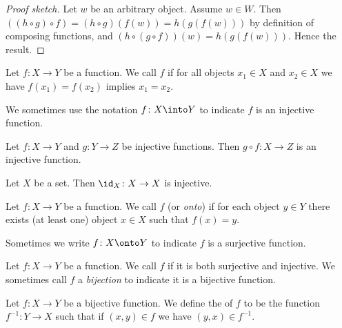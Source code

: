 \begin{proof}[Proof sketch]
Let $w$ be an arbitrary object. Assume $w\in W$. Then
$((h\circ g)\circ f) = (h\circ g)(f(w)) = h(g(f(w)))$ by definition of composing
functions, and $(h\circ(g\circ f))(w)=h(g(f(w)))$. Hence the result.
\end{proof}

\begin{definition}
Let $f\colon X\to Y$ be a function. We call $f$  if
for all objects $x_{1}\in X$ and $x_{2}\in X$ we have
$f(x_{1})=f(x_{2})$ implies $x_{1}=x_{2}$.

We sometimes use the notation $f\colon X\into Y$ to indicate $f$ is an
injective function.
\end{definition}

\begin{theorem}
Let $f\colon X\to Y$ and $g\colon Y\to Z$ be injective functions.
Then $g\circ f\colon X\to Z$ is an injective function.
\end{theorem}

\begin{theorem}
Let $X$ be a set. Then $\id_{X}\colon X\to X$ is injective.
\end{theorem}

\begin{definition}
Let $f\colon X\to Y$ be a function. We call $f$ 
(or \emph{onto}) if for each object $y\in Y$ there exists (at least
one) object $x\in X$ such that $f(x)=y$.

Sometimes we write $f\colon X\onto Y$ to indicate $f$ is a surjective
function. 
\end{definition}

\begin{definition}
Let $f\colon X\to Y$ be a function. We call $f$  if
it is both surjective and injective. We sometimes call $f$ a
\emph{bijection} to indicate it is a bijective function.
\end{definition}

\begin{definition}
Let $f\colon X\to Y$ be a bijective function. We define the
 of $f$ to be the function $f^{-1}\colon Y\to X$
such that if $(x,y)\in f$ we have $(y,x)\in f^{-1}$.
\end{definition}


